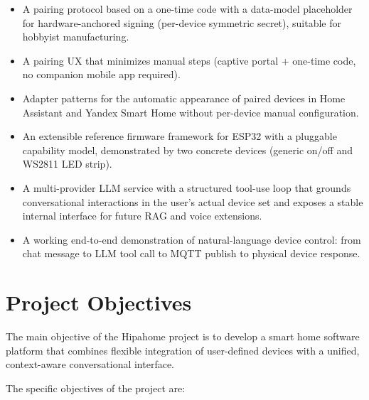 \documentclass[a4paper,12pt]{article}
\begin{document}
\begin{itemize}
  \item A pairing protocol based on a one-time code with a data-model placeholder for hardware-anchored signing (per-device symmetric secret), suitable for hobbyist manufacturing.
  \item A pairing UX that minimizes manual steps (captive portal + one-time code, no companion mobile app required).
  \item Adapter patterns for the automatic appearance of paired devices in Home Assistant and Yandex Smart Home without per-device manual configuration.
  \item An extensible reference firmware framework for ESP32 with a pluggable capability model, demonstrated by two concrete devices (generic on/off and WS2811 LED strip).
  \item A multi-provider LLM service with a structured tool-use loop that grounds conversational interactions in the user's actual device set and exposes a stable internal interface for future RAG and voice extensions.
  \item A working end-to-end demonstration of natural-language device control: from chat message to LLM tool call to MQTT publish to physical device response.
\end{itemize}

\newpage

\section{Project Objectives}
\label{sec:objectives}

The main objective of the Hipahome project is to develop a smart home software platform that combines flexible integration of user-defined devices with a unified, context-aware conversational interface.

The specific objectives of the project are:
\end{document}
